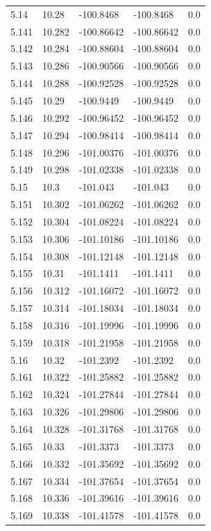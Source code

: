 \begin{tabular}{lllll}
5.14 & 10.28 & -100.8468 & -100.8468 & 0.0 \\
5.141 & 10.282 & -100.86642 & -100.86642 & 0.0 \\
5.142 & 10.284 & -100.88604 & -100.88604 & 0.0 \\
5.143 & 10.286 & -100.90566 & -100.90566 & 0.0 \\
5.144 & 10.288 & -100.92528 & -100.92528 & 0.0 \\
5.145 & 10.29 & -100.9449 & -100.9449 & 0.0 \\
5.146 & 10.292 & -100.96452 & -100.96452 & 0.0 \\
5.147 & 10.294 & -100.98414 & -100.98414 & 0.0 \\
5.148 & 10.296 & -101.00376 & -101.00376 & 0.0 \\
5.149 & 10.298 & -101.02338 & -101.02338 & 0.0 \\
5.15 & 10.3 & -101.043 & -101.043 & 0.0 \\
5.151 & 10.302 & -101.06262 & -101.06262 & 0.0 \\
5.152 & 10.304 & -101.08224 & -101.08224 & 0.0 \\
5.153 & 10.306 & -101.10186 & -101.10186 & 0.0 \\
5.154 & 10.308 & -101.12148 & -101.12148 & 0.0 \\
5.155 & 10.31 & -101.1411 & -101.1411 & 0.0 \\
5.156 & 10.312 & -101.16072 & -101.16072 & 0.0 \\
5.157 & 10.314 & -101.18034 & -101.18034 & 0.0 \\
5.158 & 10.316 & -101.19996 & -101.19996 & 0.0 \\
5.159 & 10.318 & -101.21958 & -101.21958 & 0.0 \\
5.16 & 10.32 & -101.2392 & -101.2392 & 0.0 \\
5.161 & 10.322 & -101.25882 & -101.25882 & 0.0 \\
5.162 & 10.324 & -101.27844 & -101.27844 & 0.0 \\
5.163 & 10.326 & -101.29806 & -101.29806 & 0.0 \\
5.164 & 10.328 & -101.31768 & -101.31768 & 0.0 \\
5.165 & 10.33 & -101.3373 & -101.3373 & 0.0 \\
5.166 & 10.332 & -101.35692 & -101.35692 & 0.0 \\
5.167 & 10.334 & -101.37654 & -101.37654 & 0.0 \\
5.168 & 10.336 & -101.39616 & -101.39616 & 0.0 \\
5.169 & 10.338 & -101.41578 & -101.41578 & 0.0 \\

\end{tabular}
